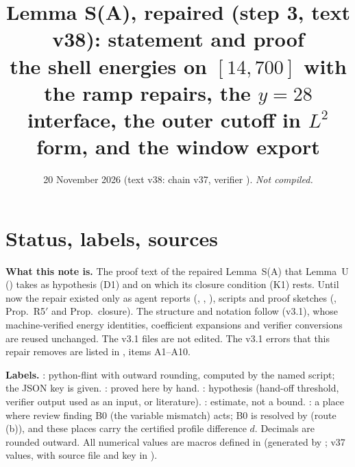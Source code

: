 \documentclass[11pt]{article}
\title{Lemma S(A), repaired (step 3, text v38): statement and proof\\[2pt]\large the shell energies on $[14,700]$ with the ramp repairs, the $y=28$ interface, the outer cutoff in $L^2$ form, and the window export}
\author{}\date{20 November 2026 (text v38: chain v37, verifier \fn{fin13v4c}). \emph{Not compiled.}}
\begin{document}
\maketitle
\tableofcontents
\fi

\section{Status, labels, sources}\label{A:sec:status}
\noindent\textbf{What this note is.} The proof text of the repaired Lemma~S(A) that Lemma~U () takes as hypothesis (D1) and on which its closure condition (K1) rests. Until now the repair existed only as agent reports (, , ), scripts and proof sketches (, Prop.~R5$'$ and Prop.~closure). The structure and notation follow  (v3.1), whose machine-verified energy identities, coefficient expansions and verifier conversions are reused unchanged. The v3.1 files are not edited. The v3.1 errors that this repair removes are listed in , items A1--A10.

\noindent\textbf{Labels.} \tC: python-flint  with outward rounding, computed by the named script; the JSON key is given. \tP: proved here by hand. \tH: hypothesis (hand-off threshold, verifier output used as an input, or literature). \tE: estimate, not a bound. \tB: a place where review finding B0 (the variable mismatch) acts; B0 is resolved by  (route (b)), and these places carry the certified profile difference $d$. Decimals are rounded outward. All numerical values are macros defined in  (generated by ; v37 values, with source file and key in ).
\end{document}

